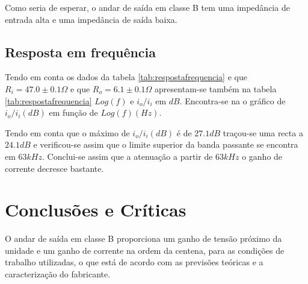 \documentclass[%
  reprint,
  nofootinbib,
  amsmath,amssymb,
  aps,
  10pt,
  a4paper
]{revtex4-1}
\begin{document}
Como seria de esperar, o andar de saída em classe B tem uma impedância de entrada alta e uma impedância de saída baixa.



\subsection{Resposta em frequência}
Tendo em conta os dados da tabela \ref{tab:respostafrequencia} e que $R_i=47.0 \pm 0.1 \Omega$ e que $R_o=6.1 \pm 0.1 \Omega$ apresentam-se também na tabela \ref{tab:respostafrequencia} $Log(f)$ e $i_o / i_i $ em $dB$. Encontra-se na   o gráfico de $i_o/i_i (dB)$ em função de $Log(f) (Hz)$.

Tendo em conta que o máximo de  $i_o/i_i (dB)$ é de $27.1 dB$ traçou-se uma recta a $24.1 dB$ e verificou-se assim que o limite superior da banda passante se encontra em $63kHz$. Conclui-se assim que a atenuação a partir de $63kHz$ o ganho de corrente decresce bastante.



\section{Conclusões e Críticas}
\label{s:conclu}
O andar de saída em classe B proporciona um ganho de tensão próximo da unidade e um ganho de corrente na ordem da centena, para as condições de trabalho utilizadas, o que está de acordo com as previsões teóricas e a caracterização do fabricante.



\nocite{*}
{}
\end{document}
